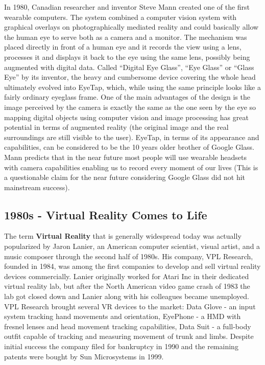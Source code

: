 \documentclass[12pt, a4paper]{article}
\begin{document}
In 1980, Canadian researcher and inventor Steve Mann created one of the first wearable computers. The system combined a computer vision system with graphical overlays on photographically mediated reality and could basically allow the human eye to serve both as a camera and a monitor. The mechanism was placed directly in front of a human eye and it records the view using a lens, processes it and displays it back to the eye using the same lens, possibly being augmented with digital data. Called “Digital Eye Glass”, “Eye Glass” or “Glass Eye” by its inventor, the heavy and cumbersome device covering the whole head ultimately evolved into EyeTap, which, while using the same principle looks like a fairly ordinary eyeglass frame. One of the main advantages of the design is the image perceived by the camera is exactly the same as the one seen by the eye so mapping digital objects using computer vision and image processing has great potential in terms of augmented reality (the original image and the real surroundings are still visible to the user). EyeTap, in terms of its appearance and capabilities, can be considered to be the 10 years older brother of Google Glass. Mann predicts that in the near future most people will use wearable headsets with camera capabilities enabling us to record every moment of our lives (This is a questionable claim for the near future considering Google Glass did not hit mainstream success).

\subsection{1980s - Virtual Reality Comes to Life}
The term \textbf{Virtual Reality} that is generally widespread today was actually popularized by Jaron Lanier, an American computer scientist, visual artist, and a music composer through the second half of 1980s. His company, VPL Research, founded in 1984, was among the first companies to develop and sell virtual reality devices commercially. Lanier originally worked for Atari Inc in their dedicated virtual reality lab, but after the North American video game crash of 1983 the lab got closed down and Lanier along with his colleagues became unemployed. VPL Research brought several VR devices to the market: Data Glove - an input system tracking hand movements and orientation, EyePhone - a HMD with fresnel lenses and head movement tracking capabilities, Data Suit - a full-body outfit capable of tracking and measuring movement of trunk and limbs. Despite initial success the company filed for bankruptcy in 1990 and the remaining patents were bought by Sun Microsystems in 1999.
\end{document}
